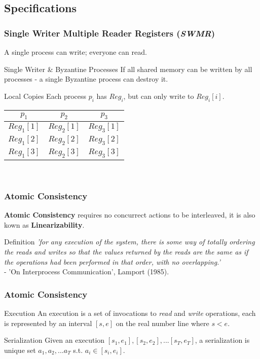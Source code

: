 \subsection{Specifications}
\begin{frame}
    \frametitle{Single Writer Multiple Reader Registers (\emph{SWMR})}
    A single process can write; everyone can read.\\
    \begin{block}{Single Writer \& Byzantine Processes}
        If all shared memory can be written by all processes - a single Byzantine process can destroy it.
    \end{block}
    \begin{block}{Local Copies}
    Each process $p_i$ has $Reg_i$, but can only write to \alert{$Reg_i[i]$}.
        \begin{center}
            \begin{tabular}{|c|c|c|}
                \hline
                $p_1$ & $p_2$ & $p_3$ \\
                \hline
                \alert{$Reg_1[1]$} & $Reg_2[1]$ & $Reg_3[1]$ \\  
                $Reg_1[2]$ & \alert{$Reg_2[2]$} & $Reg_3[2]$ \\  
                $Reg_1[3]$ & $Reg_2[3]$ & \alert{$Reg_3[3]$} \\
                \hline
            \end{tabular}\\
        \end{center}
    \end{block}
\end{frame}
\begin{frame}
    \frametitle{Atomic Consistency}
    \textbf{Atomic Consistency} requires no concurrect actions to be interleaved,
    it is also kown as \textbf{Linearizability}.
    \begin{block}{Definition}
        \emph{'for any execution of the system, there is some way of totally ordering
        the reads and writes so that the values returned by the reads are the same
        as if the operations had been performed in that order, with no overlapping.'}\\
        - 'On Interprocess Communication', Lamport (1985).
    \end{block}
\end{frame}
\begin{frame}
    \frametitle{Atomic Consistency}
    \begin{block}{Execution}
        An execution is a set of invocations to \emph{read} and \emph{write} operations,
        each is represented by an interval $[s,e]$ on
        the real number line where $s<e$.
    \end{block}
    \begin{alertblock}{Serialization}
        Given an execution $[s_1, e_1], [s_2, e_2], ... [s_T, e_T]$,
        a serialization is unique set $a_1,a_2,...a_T$ s.t. $a_i\in[s_i,e_i]$.
    \end{alertblock}
\end{frame}
